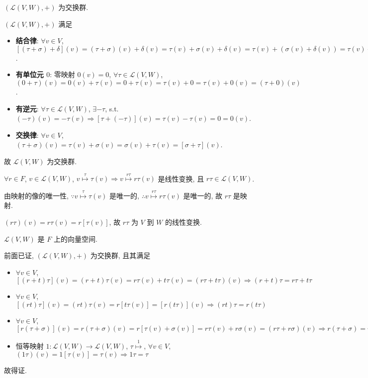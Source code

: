 \documentclass{note}
\begin{document}
$(\mathcal{L}(V,W),+)$ 为交换群.
\begin{pf}
    $(\mathcal{L}(V,W),+)$ 满足
    \begin{itemize}
        \item[(1)] \textbf{结合律}: $\forall v\in V$, $[(\tau+\sigma)+\delta](v)=(\tau+\sigma)(v)+\delta(v)=\tau(v)+\sigma(v)+\delta(v)=\tau(v)+(\sigma(v)+\delta(v))=\tau(v)+(\sigma+\delta)(v)=[\tau+(\sigma+\delta)](v)\Longrightarrow[(\tau+\sigma)+\delta]=[\tau+(\sigma+\delta)]$.
        \item[(2)] \textbf{有单位元 $0$}: 零映射 $0(v)=0$, $\forall\tau\in\mathcal{L}(V,W)$, $(0+\tau)(v)=0(v)+\tau(v)=0+\tau(v)=\tau(v)+0=\tau(v)+0(v)=(\tau+0)(v)$.
        \item[(3)] \textbf{有逆元}: $\forall\tau\in\mathcal{L}(V,W)$, $\exists-\tau$, s.t. $(-\tau)(v)=-\tau(v)\Longrightarrow[\tau+(-\tau)](v)=\tau(v)-\tau(v)=0=0(v)$.
        \item[(4)] \textbf{交换律}: $\forall v\in V$, $(\tau+\sigma)(v)=\tau(v)+\sigma(v)=\sigma(v)+\tau(v)=[\sigma+\tau](v)$.
    \end{itemize}
    故 $\mathcal{L}(V,W)$ 为交换群.
\end{pf}

$\forall r\in F$, $v\in\mathcal{L}(V,W)$, $v\overset{\tau}{\mapsto}\tau(v)\Longrightarrow v\overset{r\tau}{\mapsto}r\tau(v)$ 是线性变换, 且 $r\tau\in\mathcal{L}(V,W)$.
\begin{pf}
    由映射的像的唯一性, $\because v\overset{\tau}{\mapsto}\tau(v)$ 是唯一的, $\therefore v\overset{r\tau}{\mapsto}r\tau(v)$ 是唯一的, 故 $r\tau$ 是映射.

    $(r\tau)(v)=r\tau(v)=r[\tau(v)]$, 故 $r\tau$ 为 $V$ 到 $W$ 的线性变换.
\end{pf}

$\mathcal{L}(V,W)$ 是 $F$ 上的向量空间.
\begin{pf}
    前面已证, $(\mathcal{L}(V,W),+)$ 为交换群, 且其满足
    \begin{itemize}
        \item[(1)] $\forall v\in V$, $[(r+t)\tau](v)=(r+t)\tau(v)=r\tau(v)+t\tau(v)=(r\tau+t\tau)(v)\Longrightarrow (r+t)\tau=r\tau+t\tau$
        \item[(2)] $\forall v\in V$, $[(rt)\tau](v)=(rt)\tau(v)=r[t\tau(v)]=[r(t\tau)](v)\Longrightarrow(rt)\tau=r(t\tau)$
        \item[(3)] $\forall v\in V$, $[r(\tau+\sigma)](v)=r(\tau+\sigma)(v)=r[\tau(v)+\sigma(v)]=r\tau(v)+r\sigma(v)=(r\tau+r\sigma)(v)\Longrightarrow r(\tau+\sigma)=r\tau+r\sigma$
        \item[(4)] 恒等映射 $1:\mathcal{L}(V,W)\rightarrow\mathcal{L}(V,W)$, $\tau\overset{1}{\mapsto}$, $\forall v\in V$, $(1\tau)(v)=1[\tau(v)]=\tau(v)\Longrightarrow 1\tau=\tau$
    \end{itemize}
    故得证.
\end{pf}
\end{document}
